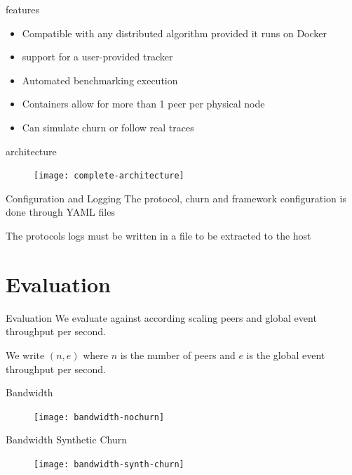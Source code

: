 \begin{frame}{\sys{} features}
    \begin{itemize}
    	\item Compatible with any distributed algorithm provided it runs on Docker
    	\item support for a user-provided tracker
    	\item Automated benchmarking execution
    	\item Containers allow for more than 1 peer per physical node
    	\item Can simulate churn or follow real traces
    \end{itemize}
\end{frame}

\begin{frame}{\sys{} architecture}
	\begin{figure}
		\texttt{[image: complete-architecture]}
	\end{figure}
\end{frame}

\begin{frame}{\sys{} Configuration and Logging}
	The protocol, churn and framework configuration is done through \textsc{YAML} files
	
	The protocols logs must be written in a file to be extracted to the host
\end{frame}

\section{Evaluation}
\subtitle[Evaluation]{Evaluation}

\begin{frame}{Evaluation}
    We evaluate \epto{} against \jgroups{} according scaling peers and global event throughput per second.
    
    We write $(n,e)$ where $n$ is the number of peers and $e$ is the global event throughput per second.
\end{frame}

\begin{frame}{Bandwidth}
	\begin{figure}
		\texttt{[image: bandwidth-nochurn]}
	\end{figure}
\end{frame}

\begin{frame}{Bandwidth Synthetic Churn}
	\begin{figure}
		\texttt{[image: bandwidth-synth-churn]}
	\end{figure}
\end{frame}

